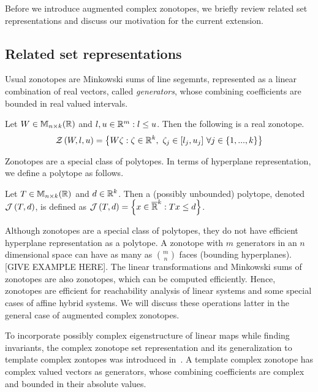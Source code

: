 
Before we introduce augmented complex zonotopes, we briefly review
related set representations and discuss our motivation for the
current extension.

\subsection{Related set representations}
Usual zonotopes are Minkowski sums of
line segemnts, represented as a linear combination of real vectors,
called \emph{generators}, whose combining coefficients
are bounded in real valued intervals.
\begin{definition}
Let $W\in\mathbb{M}_{n\times k}(\mathbb{\mathbb{R}})$ and $l,u\in\mathbb{R}^m: l\leq u$.  Then the
following is a real zonotope.
\begin{equation*}
\mathcal{Z}\left(W,l,u\right) = \left\{W\zeta: \zeta\in\mathbb{R}^k,~\zeta_j\in[l_j,u_j]~\forall j\in \{1,...,k\}\right\}
\end{equation*}
\end{definition}

Zonotopes are a special class of polytopes.  In terms of hyperplane
representation, we define a polytope as follows.
%
\begin{definition}
Let $T\in\mathbb{M}_{n\times k}(\mathbb{\mathbb{R}})$ and $d\in\mathbb{R}^k$.  Then a (possibly
unbounded) polytope, denoted $\mathcal{J}\left(T,d\right)$, is defined as
$\mathcal{J}\left(T,d\right) = \left\{x\in\mathbb{\overline{R}}^k: Tx\leq d\right\}$.

\end{definition}

Although zonotopes are a special class of polytopes, they do not have
efficient hyperplane representation as a polytope.  A zonotope with
$m$ generators in an $n$ dimensional space can have as many as
${m}\choose{n}$ faces (bounding hyperplanes).  [GIVE EXAMPLE HERE].
The linear transformations and Minkowski sums of zonotopes are also
zonotopes, which can be computed efficiently.  Hence, zonotopes are
efficient for reachability analysis of linear systems and some special
cases of affine hybrid systems.  We will discuss these operations
latter in the general case of augmented complex zonotopes.

To incorporate possibly complex eigenstructure of linear maps while
finding invariants, the complex zonotope set representation and its
generalization to template complex zontopes was introduced
in~\cite{todo}.  A template complex zonotope has complex valued
vectors as generators, whose combining coefficients are complex and
bounded in their absolute values.

